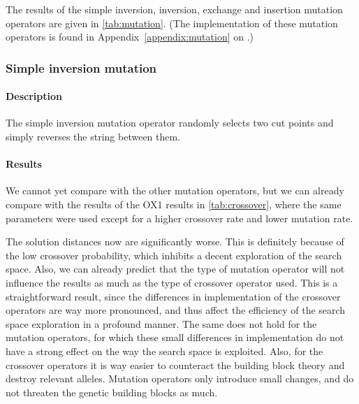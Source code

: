 \documentclass[a4paper,english,11pt,]{scrartcl}
\begin{document}
The results of the simple inversion, inversion, exchange and insertion mutation operators are given in \autoref{tab:mutation}.
(The implementation of these mutation operators is found in Appendix~\ref{appendix:mutation} on .)
% 



\subsubsection{Simple inversion mutation}
\paragraph{Description}

% 

The simple inversion mutation operator randomly selects two cut points and simply reverses the string between them.

\paragraph{Results}
We cannot yet compare with the other mutation operators, but we can already compare with the results of the OX1 results in \autoref{tab:crossover}, where the same parameters were used except for a higher crossover rate and lower mutation rate.   

The solution distances now are significantly worse. This is definitely because of the low crossover probability, which inhibits a decent exploration of the search space. Also, we can already predict that the type of mutation operator will not influence the results as much as the type of crossover operator used. This is a straightforward result, since the differences in implementation of the crossover operators are way more pronounced, and thus affect the efficiency of the search space exploration in a profound manner. The same does not hold for the mutation operators, for which these small differences in implementation do not have a strong effect on the way the search space is exploited. Also, for the crossover operators it is way easier to counteract the building block theory and destroy relevant alleles. Mutation operators only introduce small changes, and do not threaten the genetic building blocks as much.    
\end{document}
